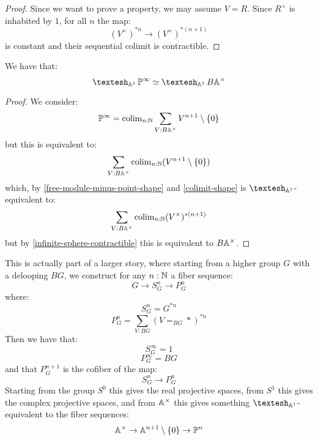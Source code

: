\begin{proof}
Since we want to prove a property, we may assume $V=R$. Since $R^\times$ is inhabited by $1$, for all $n$ the map:
\[(V^\times)^{*n} \to (V^\times)^{*(n+1)}\]
is constant and their sequential colimit is contractible.
\end{proof}

\begin{proposition}
We have that:
\[\shape_{\A^1} \bP^\infty \simeq \shape_{\A^1} B\A^\times\]
\end{proposition}

\begin{proof}
We consider:
\[\mathbb{P}^\infty = \mathrm{colim}_{n:\mathbb{N}} \sum_{V:B\mathbb{A}^\times} V^{n+1}\setminus\{0\}\]
but this is equivalent to:
\[ \sum_{V:B\mathbb{A}^\times}\mathrm{colim}_{n:\mathbb{N}} (V^{n+1}\setminus\{0\}) \]
which, by \cref{free-module-minus-point-shape} and \cref{colimit-shape} is $\shape_{\A^1}$-equivalent to:
\[ \sum_{V:B\mathbb{A}^\times}\mathrm{colim}_{n:\mathbb{N}} (V^\times)^{*(n+1)}\]
but by \cref{infinite-sphere-contractible} this is equivalent to $B\mathbb{A}^\times$.
\end{proof}

\begin{remark}
This is actually part of a larger story, where starting from a higher group $G$ with a delooping $BG$, we construct for any $n:\mathbb{N}$ a fiber sequence:
\[G \to S_G^n \to P_G^n\]
where:
\[S_G^n = G^{*n}\]
\[P_G^n = \sum_{V:BG} (V=_{BG}*)^{*n}\]
Then we have that:
\[S_G^\infty = 1\]
\[P_G^\infty = BG\]
and that $P_G^{n+1}$ is the cofiber of the map:
\[S_G^n \to P_G^n\]
Starting from the group $S^0$ this gives the real projective spaces, from $S^1$ this gives the complex projective spaces, and from $\mathbb{A}^\times$ this gives something $\shape_{\A^1}$-equivalent to the fiber sequences:
\[\mathbb{A}^\times \to \mathbb{A}^{n+1} \setminus \{0\} \to \mathbb{P}^n\]
\end{remark}
